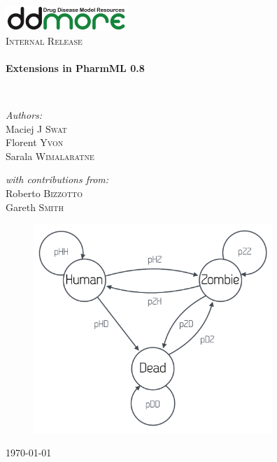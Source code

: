 \begin{titlepage}
\begin{center}

\includegraphics[width=0.35\textwidth]{./logo/ddmore_logo}~\\[1cm]

%
\textsc{\Large Internal Release}\\[0.5cm]

\HRule \\[0.4cm]
{ \huge \bfseries Extensions in PharmML 0.8 \\[0.4cm] }

\HRule \\[1.5cm]

\begin{minipage}{0.5\textwidth}
\begin{flushleft} \large
\emph{Authors:}\\
Maciej J \textsc{Swat}\\
Florent \textsc{Yvon}\\
Sarala \textsc{Wimalaratne}\\
\end{flushleft}
\end{minipage}
\begin{minipage}{0.4\textwidth}
\begin{flushright} \large
\emph{with contributions from:} \\
Roberto \textsc{Bizzotto} \\
Gareth \textsc{Smith} \\
\end{flushright}
\end{minipage}

\vfill
\begin{figure}[htb]
\centering
  \includegraphics[width=90mm]{pics/MarkovZombie_title}
\end{figure}



\vfill

{\large \today \\}

\end{center}
\end{titlepage}